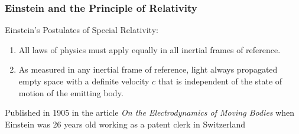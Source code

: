 \documentclass[12pt,aspectratio=169]{beamer}
\begin{document}
\begin{frame}
  \frametitle{Einstein and the Principle of Relativity}
  Einstein's Postulates of Special Relativity:
  \begin{enumerate}
  \item All laws of physics must apply equally in all inertial frames of
    reference.
  \item As measured in any inertial frame of reference, light always propagated
    empty space with a definite velocity $c$ that is independent of the state
    of motion of the emitting body.
  \end{enumerate}
  Published in 1905 in the article
  \emph{On the Electrodynamics of Moving Bodies} when Einstein was 26 years old
  working as a patent clerk in Switzerland
\end{frame}
\end{document}
